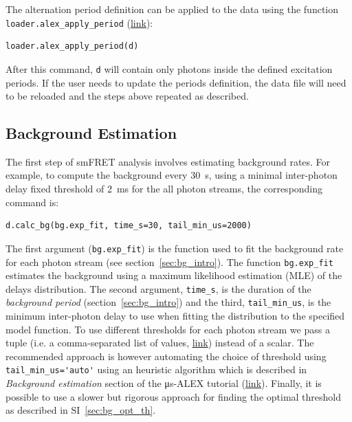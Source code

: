 \documentclass[10pt,letterpaper]{article}
\begin{document}
The alternation period definition can be applied to the data
using the function \verb|loader.alex_apply_period|
(\href{http://fretbursts.readthedocs.org/en/latest/loader.html#fretbursts.loader.alex_apply_period}{link}):

\begin{lstlisting}
loader.alex_apply_period(d)
\end{lstlisting}

After this command, \verb|d| will contain only photons inside the defined excitation periods.
If the user needs to update the periods definition, the data file will need to be
reloaded and the steps above repeated as described.


\subsection{Background Estimation}
\label{sec:bg_calc}

The first step of smFRET analysis involves estimating background rates.
For example, to compute the background every 30~s, using a minimal inter-photon
delay fixed threshold of 2~ms for the all photon streams, the corresponding command is:

\begin{lstlisting}
d.calc_bg(bg.exp_fit, time_s=30, tail_min_us=2000)
\end{lstlisting}

The first argument (\verb|bg.exp_fit|) is the function used to fit the
background rate for each photon stream (see section~\ref{sec:bg_intro}).
The function
\verb|bg.exp_fit| estimates the background using a maximum likelihood estimation
(MLE) of the delays distribution.
The second argument, \verb|time_s|, is the duration of the
\textit{background period} (section~\ref{sec:bg_intro}) and the third, \verb|tail_min_us|,
is the minimum inter-photon delay to use when fitting the distribution to the specified model function.
To use different thresholds for each photon stream we pass a
tuple (i.e. a comma-separated list of values, \href{https://docs.python.org/3.5/tutorial/datastructures.html#tuples-and-sequences}{link}) instead of a scalar.
The recommended approach is however automating the choice of threshold using
\verb|tail_min_us='auto'| using an heuristic algorithm which is described in
\textit{Background estimation} section of the μs-ALEX tutorial 
(\href{http://nbviewer.jupyter.org/github/tritemio/FRETBursts_notebooks/blob/master/notebooks/FRETBursts%20-%20us-ALEX%20smFRET%20burst%20analysis.ipynb#Background-estimation}{link}).
Finally, it is possible to use a slower but rigorous approach for finding the optimal
threshold as described in SI~\ref{sec:bg_opt_th}.
\end{document}
